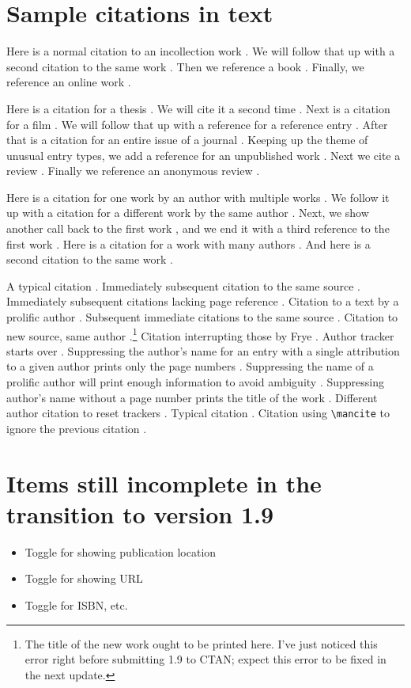\documentclass{article}
\begin{document}
	
\section{Sample citations in text}
Here is a normal citation to an incollection work \autocite[7]{haggis99aa}. We will follow that up with a second citation to the same work \autocite[8]{haggis99aa}. Then we reference a book \autocite[194]{public08aa}. Finally, we reference an online work \autocite{Grammar-Girl2008}.

Here is a citation for a thesis \autocite[22]{webb84aa}. We will cite it a second time \autocite[23]{webb84aa}. Next is a citation for a film \autocite{jhabvala85aa}. We will follow that up with a reference for a reference entry \autocite{reference-noon89aa}. After that is a citation for an entire issue of a journal \autocite{appiah92aa}. Keeping up the theme of unusual entry types, we add a reference for an unpublished work \autocite{salviatiXXaa}. Next we cite a review \autocite[224]{slater01aa}. Finally we reference an anonymous review \autocite[785]{danish1972aa}.

Here is a citation for one work by an author with multiple works \autocite[12]{askme06aa}. We follow it up with a citation for a different work by the same author \autocite[34]{askme92aa}. Next, we show another call back to the first work \autocite[45]{askme06aa}, and we end it with a third reference to the first work \autocite[56]{askme06aa}. Here is a citation for a work with many authors \autocite[34]{Babich:2011dg}. And here is a second citation to the same work \autocite[32]{Babich:2011dg}.

A typical citation \autocite[12]{morrison02aa}. Immediately subsequent citation to the same source \autocite[34]{morrison02aa}. Immediately subsequent citations lacking page reference \autocite{morrison02aa}. Citation to a text by a prolific author \autocite[12]{frye57ab}. Subsequent immediate citations to the same source \autocite[34]{frye57ab}. Citation to new source, same author \autocite[56]{frye91aa}.\footnote{The title of the new work ought to be printed here. I've just noticed this error right before submitting 1.9 to CTAN; expect this error to be fixed in the next update.} Citation interrupting those by Frye \autocite[101]{morrison02aa}. Author tracker starts over \autocite[78]{frye91aa}. Suppressing the author's name for an entry with a single attribution to a given author prints only the page numbers \autocite*[102]{morrison02aa}. Suppressing the name of a prolific author will print enough information to avoid ambiguity \autocite*[91]{frye57ab}. Suppressing author's name without a page number prints the title of the work \autocite*{morrison02aa}. Different author citation to reset trackers \autocite[91]{frye91aa}. Typical citation \autocite[12]{morrison02aa}. Citation using \verb|\mancite| to ignore the previous citation \mancite\autocite[34]{morrison02aa}.

\section{Items still incomplete in the transition to version 1.9}
\begin{itemize}
	\item Toggle for showing publication location
	\item Toggle for showing URL
	\item Toggle for ISBN, etc.
\end{itemize}

\nocite{*}

\printbibliography
\end{document}
